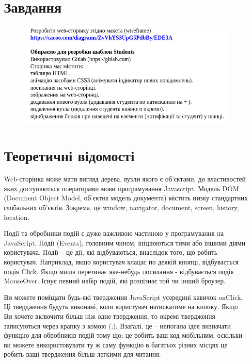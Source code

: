 \documentclass[oneside,14pt]{extarticle}
\begin{document}
\begin{normalsize}
	\section*{Завдання}
	\begin{figure}[H]
		\centering
		\includegraphics[scale=0.7]{v}
	\end{figure}

	\section*{Теоретичні відомості}
	Web-сторінка може мати вигляд дерева, вузли якого є об’єктами, до властивостей
	яких доступаються операторами мови програмування Javascript.
	Модель DOM (Document Object Model, об’єктна модель документа) містить низку
	стандартних глобальних об’єктів. Зокрема, це window, navigator, document,
	screen, history, location.
	
	Події та обробники подій є дуже важливою частиною у програмування на JavaScript.
	Події (Events), головним чином, ініціюються тими або іншими діями користувача. Події –
	це дії, які відбуваються, внаслідок того, що робить користувач. Наприклад, якщо
	користувач клацає по деякій кнопці, відбувається подія Click. Якщо миша перетинає
	яке-небудь посилання - відбувається подія MouseOver. Існує певний набір подій, які
	розпізнає той чи інший броузер.
	
	Ви можете поміщати будь-які твердження JavaScript усередині кавичок onClick. Ці
	твердження будуть виконані, коли користувач натискатиме на кнопку. Якщо Ви хочете
	включити більш ніж одне твердження, то окремі твердження записуються через крапку з
	комою (;).
	Взагалі, це – непогана ідея визначати функцію для обробників подій тому що: це робить ваш код мобільним, оскільки ви можете використовувати ту ж саму
	функцію в багатьох різних місцях це робить ваші твердження більш легкими для читання.


\end{normalsize}
\end{document}
